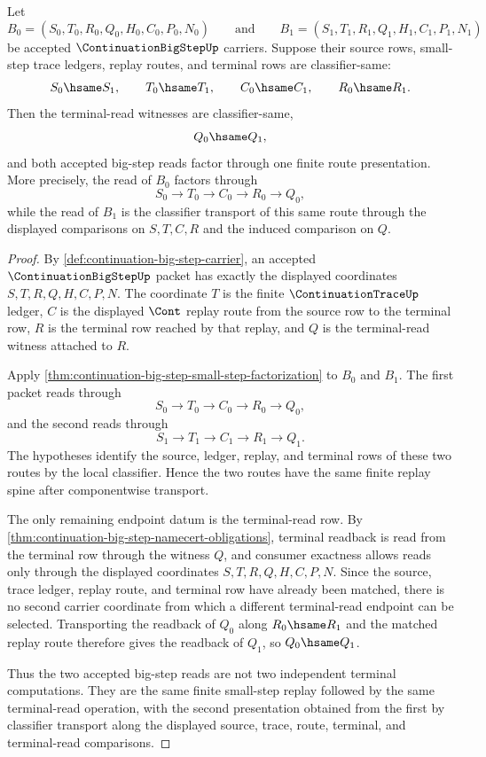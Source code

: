\begin{theorem}
\label{thm:continuation-big-step-terminal-read-determinacy}
Let
$$
B_0=(S_0,T_0,R_0,Q_0,H_0,C_0,P_0,N_0)
\qquad\text{and}\qquad
B_1=(S_1,T_1,R_1,Q_1,H_1,C_1,P_1,N_1)
$$
be accepted $\ContinuationBigStepUp$ carriers. Suppose their source rows, small-step trace ledgers, replay routes, and terminal rows are classifier-same:
$$
S_0\hsame S_1,
\qquad
T_0\hsame T_1,
\qquad
C_0\hsame C_1,
\qquad
R_0\hsame R_1.
$$
Then the terminal-read witnesses are classifier-same,
$$
Q_0\hsame Q_1,
$$
and both accepted big-step reads factor through one finite route presentation. More precisely, the read of $B_0$ factors through
$$
S_0\longrightarrow T_0\longrightarrow C_0\longrightarrow R_0\longrightarrow Q_0,
$$
while the read of $B_1$ is the classifier transport of this same route through the displayed comparisons on $S,T,C,R$ and the induced comparison on $Q$.
\end{theorem}
\begin{proof}
By \autoref{def:continuation-big-step-carrier}, an accepted $\ContinuationBigStepUp$ packet has exactly the displayed coordinates $S,T,R,Q,H,C,P,N$. The coordinate $T$ is the finite $\ContinuationTraceUp$ ledger, $C$ is the displayed $\Cont$ replay route from the source row to the terminal row, $R$ is the terminal row reached by that replay, and $Q$ is the terminal-read witness attached to $R$.

Apply \autoref{thm:continuation-big-step-small-step-factorization} to $B_0$ and $B_1$. The first packet reads through
$$
S_0\longrightarrow T_0\longrightarrow C_0\longrightarrow R_0\longrightarrow Q_0,
$$
and the second reads through
$$
S_1\longrightarrow T_1\longrightarrow C_1\longrightarrow R_1\longrightarrow Q_1.
$$
The hypotheses identify the source, ledger, replay, and terminal rows of these two routes by the local classifier. Hence the two routes have the same finite replay spine after componentwise transport.

The only remaining endpoint datum is the terminal-read row. By \autoref{thm:continuation-big-step-namecert-obligations}, terminal readback is read from the terminal row through the witness $Q$, and consumer exactness allows reads only through the displayed coordinates $S,T,R,Q,H,C,P,N$. Since the source, trace ledger, replay route, and terminal row have already been matched, there is no second carrier coordinate from which a different terminal-read endpoint can be selected. Transporting the readback of $Q_0$ along $R_0\hsame R_1$ and the matched replay route therefore gives the readback of $Q_1$, so $Q_0\hsame Q_1$.

Thus the two accepted big-step reads are not two independent terminal computations. They are the same finite small-step replay followed by the same terminal-read operation, with the second presentation obtained from the first by classifier transport along the displayed source, trace, route, terminal, and terminal-read comparisons.
\end{proof}

